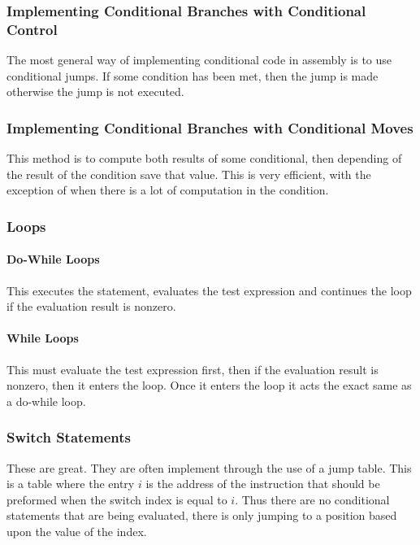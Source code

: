 \documentclass[10pt]{armath}
\begin{document}
\subsubsection{Implementing Conditional Branches with Conditional Control}%
\label{ssub:implementing_conditional_brances_with_conditional_control}

The most general way of implementing conditional code in assembly is to use
conditional jumps. If some condition has been met, then the jump is made
otherwise the jump is not executed.

\subsubsection{Implementing Conditional Branches with Conditional Moves}%
\label{ssub:implementing_conditional_brances_with_conditional_moves}

This method is to compute both results of some conditional, then depending of
the result of the condition save that value. This is very efficient, with the
exception of when there is a lot of computation in the condition.

\subsubsection{Loops}%
\label{ssub:loops}

\paragraph{Do-While Loops}%
\label{par:do_while_loops}

This executes the statement, evaluates the test expression and continues the
loop if the evaluation result is nonzero.

\paragraph{While Loops}%
\label{par:while_loops}

This must evaluate the test expression first, then if the evaluation result is
nonzero, then it enters the loop. Once it enters the loop it acts the exact
same as a do-while loop.

\subsubsection{Switch Statements}%
\label{ssub:switch_statements}

These are great. They are often implement through the use of a jump table. This
is a table where the entry $i$ is the address of the instruction that should be
preformed when the switch index is equal to $i$. Thus there are no conditional
statements that are being evaluated, there is only jumping to a position based
upon the value of the index.
\end{document}
